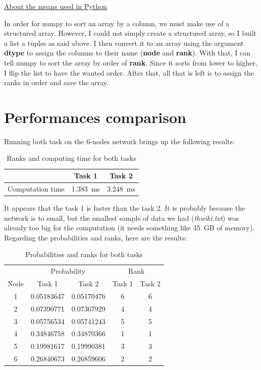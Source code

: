 \underline{About the means used in Python}

\hfill
\begin{minipage}{.95\linewidth}
    In order for numpy to sort an array by a column, we must make use of a structured array. However, I could not simply create a structured array, so I built a list a tuples as said above. I then convert it to an array using the argument \textbf{dtype} to assign the columns to their name (\textbf{node} and \textbf{rank}). With that, I can tell numpy to sort the array by order of \textbf{rank}. Since it sorts from lower to higher, I flip the list to have the wanted order. After that, all that is left is to assign the ranks in order and save the array.

\end{minipage}
\section{Performances comparison}
Running both task on the 6-nodes network brings up the following results:
\begin{table}[htbp]
    \centering
    \begin{tabular}{lcc}
        \toprule
        & Task 1 & Task 2\\
        \midrule
        Computation time & \SI{1.383}{\milli\second} & \SI{3.248}{\milli\second}\\
        \bottomrule
    \end{tabular}
    \caption{Ranks and computing time for both tasks}\label{tab:time-comparison}
\end{table}

 It appears that the task 1 is faster than the task 2. It is probably because the network is to small, but the smallest sample of data we had (\textit{thwiki.txt}) was already too big for the computation (it needs something like \SI{45}{\giga B} of memory). Regarding the probabilities and ranks, here are the results:

\begin{table}[htbp]
    \centering
    \begin{tabular}{ccccc}
        \toprule
        & \multicolumn{2}{c}{Probability} & \multicolumn{2}{c}{Rank}\\
        \cmidrule(l{2pt}r{2pt}){2-3} \cmidrule(l{2pt}r{2pt}){4-5}
        Node & Task 1 & Task 2 & Task 1 & Task 2\\
        \midrule
        1 & 0.05183647 & 0.05170476 & 6 & 6\\
        2 & 0.07390771 & 0.07367929 & 4 & 4\\
        3 & 0.05756534 & 0.05741243 & 5 & 5\\
        4 & 0.34846758 & 0.34870366 & 1 & 1\\
        5 & 0.19981617 & 0.19990381 & 3 & 3\\
        6 & 0.26840673 & 0.26859606 & 2 & 2\\
        \bottomrule
    \end{tabular}
    \caption{Probabilities and ranks for both tasks}\label{tab:prob-rank-comparison}
\end{table}


